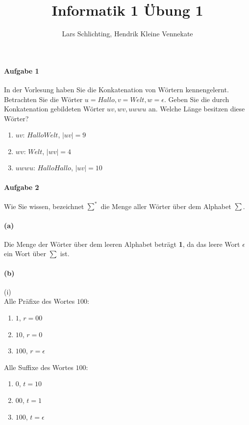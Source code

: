 \documentclass[12pt, letterpaper]{article}
\title{Informatik 1 Übung 1}
\author{Lars Schlichting, Hendrik Kleine Vennekate}
\date{}
\begin{document}
\maketitle

\paragraph{Aufgabe 1}

In der Vorlesung haben Sie die Konkatenation von Wörtern kennengelernt. Betrachten Sie die Wörter $u = Hallo, v = Welt, w = \epsilon$. Geben Sie die durch Konkatenation gebildeten Wörter $uv, wv, uwwu$ an. Welche Länge besitzen diese Wörter?

\begin{enumerate}
    \item $uv$: $HalloWelt$, $\mid uv \mid=9$ 
    \item $wv$: $Welt$, $\mid wv \mid=4$ 
    \item $uwwu$: $HalloHallo$, $\mid uv \mid=10$ 
\end{enumerate}

\paragraph{Aufgabe 2}

Wie Sie wissen, bezeichnet $\sum^{*}$ die Menge aller Wörter über dem Alphabet $\sum$.

\paragraph{(a)}
Die Menge der Wörter über dem leeren Alphabet beträgt \textbf{1}, da das leere Wort $\epsilon$ ein Wort über $\sum$ ist. 

\paragraph{(b)}
(i)\\

\noindent Alle Präfixe des Wortes $100$:
\begin{enumerate}
    \item $1$, $r = 00$
    \item $10$, $r = 0$
    \item $100$, $r = \epsilon$
\end{enumerate}
\noindent Alle Suffixe des Wortes $100$:
\begin{enumerate}
    \item $0$, $t = 10$
    \item $00$, $t = 1$
    \item $100$, $t = \epsilon$
\end{enumerate}
\end{document}
